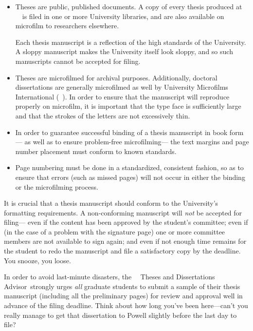 \documentclass {article}
\newcommand {\caps}[1] {\mbox {\ifnum\fam=0 \scshape\else\uppercase\fi{#1}}}
\newcommand {\tdadvisor} {Theses and Dissertations Advisor}
\newcommand {\ucla} {\caps {ucla}}
\newcommand {\umi} {\caps {umi}}
\begin{document}
\begin {itemize}

\item
Theses are public, published documents.
A copy of every thesis produced at \ucla\
is filed in one or more University libraries,
and are also available on microfilm
to researchers elsewhere.

Each thesis manuscript is a reflection
of the high standards of the University.
A sloppy manuscript makes the University itself look sloppy,
and so such manuscripts cannot be accepted for filing.

\item
Theses are microfilmed for archival purposes.
Additionally, doctoral dissertations are generally
microfilmed as well by University Microfilms International (\umi).
In order to ensure that the manuscript
will reproduce properly on microfilm,
it is important that the type face is sufficiently large
and that the strokes of the letters are not excessively thin.

\item
In order to guarantee successful binding
of a thesis manuscript in book form---%
as well as to ensure problem-free microfilming---%
the text margins and page number placement
must conform to known standards.

\item
Page numbering must be done in a standardized, consistent fashion,
so as to ensure that errors (such as missed pages)
will not occur in either the binding or the microfilming process.

\end {itemize}

It is crucial that a thesis manuscript
should conform to the University's formatting requirements.
A non-conforming manuscript will \emph{not} be accepted for filing---%
even if the content has been approved
by the student's committee;
even if (in the case of a problem with the signature page)
one or more committee members are not available to sign again;
and even if not enough time remains for the student
to redo the manuscript and file a satisfactory copy by the deadline.
You snooze, you loose.

In order to avoid last-minute disasters,
the \ucla\ \tdadvisor\ strongly urges \emph{all} graduate students
to submit a sample of their thesis manuscript
(including all the preliminary pages)
for review and approval well in advance of the filing deadline.
Think about how long you've been here---can't you really 
  manage to get that dissertation to Powell slightly before the
  last day to file?
\end{document}
